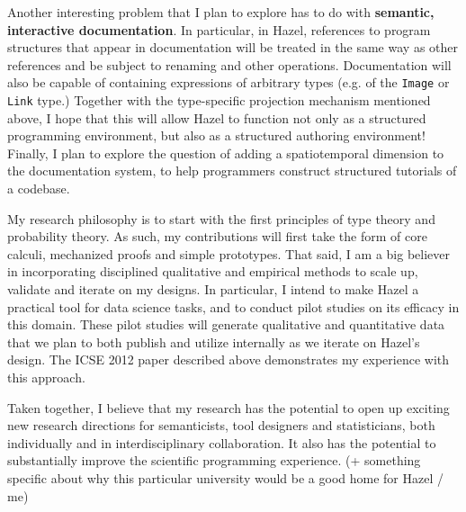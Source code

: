 \documentclass[10pt]{article}
\let\li\lstinline
\begin{document}
Another interesting problem that I plan to explore has to do with \textbf{semantic, interactive documentation}. In particular, in Hazel, references to program structures that appear in documentation will be treated in the same way as other references and be subject to renaming and other operations. Documentation will also be capable of containing expressions of arbitrary types (e.g. of the \li{Image} or \li{Link} type.) Together with the type-specific projection mechanism mentioned above, I hope that this will allow Hazel to function not only as a structured programming environment, but also as a structured authoring environment! Finally, I plan to explore the question of adding a spatiotemporal dimension to the documentation system, to help programmers construct structured tutorials of a codebase.

My research philosophy is to start with the first principles of type theory and probability theory. As such, my contributions will first take the form of core calculi, mechanized proofs and simple prototypes. That said, I am a big believer in incorporating disciplined qualitative and empirical methods to scale up, validate and iterate on my designs. In particular, I intend to make Hazel a practical tool for data science tasks, and to conduct pilot studies on its efficacy in this domain. These pilot studies will generate qualitative and quantitative data that we plan to both publish and utilize internally as we iterate on Hazel's design. The ICSE 2012 paper described above demonstrates my experience with this approach.

 Taken together, I believe that my research has the potential to open up exciting new research directions for semanticists, tool designers and statisticians, both individually and in interdisciplinary collaboration. It also has the potential to substantially improve the scientific programming experience. (+ something specific about why this particular university would be a good home for Hazel / me)
\end{document}

